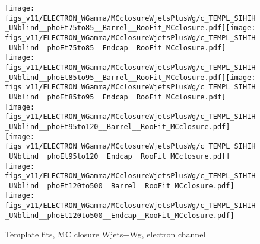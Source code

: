 \begin{figure}[htb]
  \begin{center}
   \texttt{[image: figs\_v11/ELECTRON\_WGamma/MCclosureWjetsPlusWg/c\_TEMPL\_SIHIH\_UNblind\_\_phoEt75to85\_\_Barrel\_\_RooFit\_MCclosure.pdf]}\texttt{[image: figs\_v11/ELECTRON\_WGamma/MCclosureWjetsPlusWg/c\_TEMPL\_SIHIH\_UNblind\_\_phoEt75to85\_\_Endcap\_\_RooFit\_MCclosure.pdf]}\\
   \texttt{[image: figs\_v11/ELECTRON\_WGamma/MCclosureWjetsPlusWg/c\_TEMPL\_SIHIH\_UNblind\_\_phoEt85to95\_\_Barrel\_\_RooFit\_MCclosure.pdf]}\texttt{[image: figs\_v11/ELECTRON\_WGamma/MCclosureWjetsPlusWg/c\_TEMPL\_SIHIH\_UNblind\_\_phoEt85to95\_\_Endcap\_\_RooFit\_MCclosure.pdf]}\\
   \texttt{[image: figs\_v11/ELECTRON\_WGamma/MCclosureWjetsPlusWg/c\_TEMPL\_SIHIH\_UNblind\_\_phoEt95to120\_\_Barrel\_\_RooFit\_MCclosure.pdf]}\texttt{[image: figs\_v11/ELECTRON\_WGamma/MCclosureWjetsPlusWg/c\_TEMPL\_SIHIH\_UNblind\_\_phoEt95to120\_\_Endcap\_\_RooFit\_MCclosure.pdf]}\\
   \texttt{[image: figs\_v11/ELECTRON\_WGamma/MCclosureWjetsPlusWg/c\_TEMPL\_SIHIH\_UNblind\_\_phoEt120to500\_\_Barrel\_\_RooFit\_MCclosure.pdf]}\texttt{[image: figs\_v11/ELECTRON\_WGamma/MCclosureWjetsPlusWg/c\_TEMPL\_SIHIH\_UNblind\_\_phoEt120to500\_\_Endcap\_\_RooFit\_MCclosure.pdf]}\\
  \label{fig:templateFits_MCclosureWjetsPlusWg_SIHIH_ELECTRON_3}
  \caption{Template fits, MC closure Wjets+Wg, electron channel}
  \end{center}
\end{figure}
